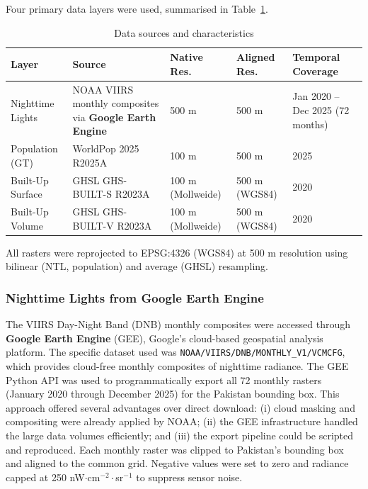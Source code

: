 \documentclass[12pt,a4paper]{article}
\begin{document}
Four primary data layers were used, summarised in Table~\ref{tab:data}.

\begin{table}[H]
\centering
\caption{Data sources and characteristics}
\label{tab:data}
\begin{tabular}{@{}p{3.2cm}p{3.8cm}p{2.2cm}p{2.2cm}p{2.8cm}@{}}
\toprule
\textbf{Layer} & \textbf{Source} & \textbf{Native Res.} & \textbf{Aligned Res.} & \textbf{Temporal Coverage} \\
\midrule
Nighttime Lights & NOAA VIIRS monthly composites via \textbf{Google Earth Engine} & 500 m & 500 m & Jan 2020 -- Dec 2025 (72 months) \\
Population (GT) & WorldPop 2025 R2025A & 100 m & 500 m & 2025 \\
Built-Up Surface & GHSL GHS-BUILT-S R2023A & 100 m (Mollweide) & 500 m (WGS84) & 2020 \\
Built-Up Volume & GHSL GHS-BUILT-V R2023A & 100 m (Mollweide) & 500 m (WGS84) & 2020 \\
\bottomrule
\end{tabular}
\end{table}

All rasters were reprojected to EPSG:4326 (WGS84) at 500 m resolution using bilinear (NTL, population) and average (GHSL) resampling.

\subsubsection{Nighttime Lights from Google Earth Engine}

The VIIRS Day-Night Band (DNB) monthly composites were accessed through \textbf{Google Earth Engine} (GEE), Google's cloud-based geospatial analysis platform. The specific dataset used was \texttt{NOAA/VIIRS/DNB/MONTHLY\_V1/VCMCFG}, which provides cloud-free monthly composites of nighttime radiance. The GEE Python API was used to programmatically export all 72 monthly rasters (January 2020 through December 2025) for the Pakistan bounding box. This approach offered several advantages over direct download: (i) cloud masking and compositing were already applied by NOAA; (ii) the GEE infrastructure handled the large data volumes efficiently; and (iii) the export pipeline could be scripted and reproduced. Each monthly raster was clipped to Pakistan's bounding box and aligned to the common grid. Negative values were set to zero and radiance capped at 250 nW$\cdot$cm$^{-2}\cdot$sr$^{-1}$ to suppress sensor noise.
\end{document}
